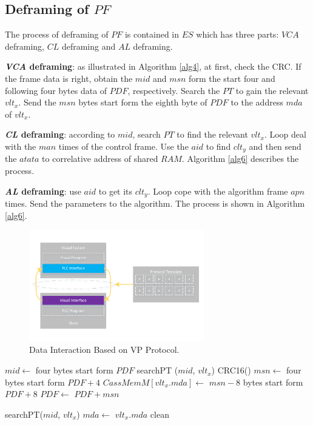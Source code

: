 \documentclass[journal,UTF8]{IEEEtran}
\begin{document}
\subsection{Deframing of $PF$}
 The process of deframing of $PF$ is contained in $ES$ which has three parts: $VCA$ deframing, $CL$ deframing and $AL$ deframing.

\textbf{\emph{VCA} deframing}: as illustrated in Algorithm \ref{alg4}, at first, check the CRC. If the frame data is right, obtain the $mid$ and $msn$ form the start four and following four bytes data of $PDF$, respectively. Search the $PT$ to gain the relevant $vlt_x$. Send the $msn$ bytes start form the eighth byte of $PDF$ to the address $mda$ of $vlt_x$.

\textbf{\emph{CL} deframing}: according to $mid$, search $PT$ to find the relevant $vlt_x$. Loop deal with the $man$ times of the control frame. Use the $aid$ to find $clt_y$ and then send the $atata$ to correlative address of shared $RAM$. Algorithm \ref{alg6} describes the process.

\textbf{\emph{AL} deframing}: use $aid$ to get its $clt_y$. Loop cope with the algorithm frame $apn$ times. Send the parameters to the algorithm. The process is shown in Algorithm \ref{alg6}.

\begin{figure}
	\centering
	\includegraphics[width=3in]{fig/FlexibleLayer.pdf}
	\caption{ Data Interaction Based on VP Protocol.}
	\label{fig:FlexibleLayer}
\end{figure}
\begin{algorithm}
	\label{alg4}
	\caption{$VLDeframing$}%
    $mid \leftarrow$ four bytes start form $PDF$\;
    searchPT ($mid$, $vlt_x$)\;
    CRC16()\;
    $msn \leftarrow$ four bytes start form $PDF+4$\;    
	$CassMemM[vlt_x.mda]\leftarrow$ $msn-8$ bytes start form $PDF+8$\;
	$PDF\leftarrow$ $PDF+msn$\;
\end{algorithm}

\begin{algorithm}
	\label{alg5}
	\caption{$CLDeframing$}%
	searchPT($mid$, $vlt_x$)\;
	$mda\leftarrow$ $vlt_x.mda$\;
    clean\;
\end{algorithm}
\end{document}
